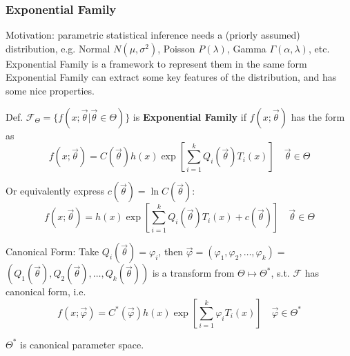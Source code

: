 \subsubsection{Exponential Family}\label{SubSectionExponentialFamily}

Motivation: parametric statistical inference needs a (priorly assumed) distribution, e.g. Normal $ N(\mu ,\sigma ^2) $, Poisson $ P(\lambda ) $, Gamma $ \Gamma (\alpha ,\lambda ) $, etc. Exponential Family is a framework to represent them in the same form Exponential Family can extract some key features of the distribution, and has some nice properties.

Def. $\mathscr{F}_\Theta=\{f(x;\vec{\theta}|\vec{\theta}\in\Theta)\}$ is \textbf{Exponential Family} if $f(x;\vec{\theta})$ has the form as
\begin{equation}
    f(x;\vec{\theta})=C(\vec{\theta})h(x)\exp \left[  \sum_{i=1}^k Q_i(\vec{\theta})T_i(x) \right]\quad\vec{\theta}\in\Theta
\end{equation}    

    Or equivalently express $ c(\vec{\theta })=\ln C(\vec{\theta }) $:
\begin{equation}
    f(x;\vec{\theta})=h(x)\exp \left[  \sum_{i=1}^k Q_i(\vec{\theta})T_i(x) +c(\vec{\theta }) \right]\quad\vec{\theta}\in\Theta
\end{equation}   

    Canonical Form: Take $Q_i(\vec{\theta})=\varphi_i$, then $\vec{\varphi}=(\varphi_1,\varphi_2,\ldots,\varphi_k)=$$(Q_1(\vec{\theta}),Q_2(\vec{\theta}),\ldots,Q_k(\vec{\theta}))$ is a transform from $\Theta\mapsto\Theta^*$, s.t. $\mathscr{F}$ has canonical form, i.e.
    \begin{equation}\label{EqaExponentialDistributionFamily}
        f(x;\vec{\varphi})=C^*(\vec{\varphi})h(x)   \exp\left[  \sum_{i=1}^k \varphi_i T_i(x) \right] \quad \vec{\varphi}\in\Theta^*
    \end{equation}

    $\Theta^*$ is canonical parameter space.

